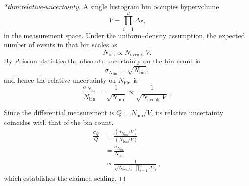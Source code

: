 \begin{proof}[*thm:relative-uncertainty]
            
                A single histogram bin occupies hypervolume
                \[
                    V = \prod_{i=1}^d \Delta z_i
                \]
                in the measurement space.
                Under the uniform--density assumption, the expected number of events in that bin scales as
                \[
                    N_{\text{bin}} \propto N_{\text{events}}\;V.
                \]
                By Poisson statistics the absolute uncertainty on the bin count is
                \[
                    \sigma_{N_{\text{bin}}} = \sqrt{N_{\text{bin}}},
                \]
                and hence the relative uncertainty on \(N_{\text{bin}}\) is
                \[
                    \frac{\sigma_{N_{\text{bin}}}}{N_{\text{bin}}} = \frac{1}{\sqrt{N_{\text{bin}}}} \propto \frac{1}{\sqrt{N_{\text{events}}\,V}}\;.
                \]
                
                Since the differential measurement is \(Q = N_{\text{bin}}/V\), its relative uncertainty coincides with that of the bin count.
                \begin{align}
                    \frac{\sigma_Q}{Q} &= \frac{(\sigma_{N_{\text{bin}}}/V)}{(N_{\text{bin}}/V)} \\
                    &= \frac{\sigma_{N_{\text{bin}}}}{N_{\text{bin}}} \\
                    &\propto \frac{1}{\sqrt{N_{\text{events}}}\;\prod_{i=1}^d\Delta z_i}\;,
                \end{align}
                which establishes the claimed scaling.
            \end{proof}

